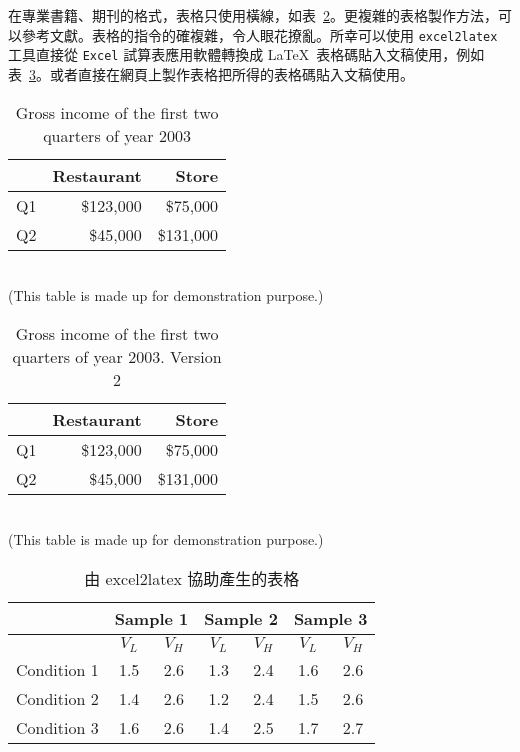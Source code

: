 在專業書籍、期刊的格式，表格只使用橫線，如表~\ref{tb:income_2003_v2}。更複雜的表格製作方法，可以參考文獻\cite{url_latex_wikibook_table}。表格的指令的確複雜，令人眼花撩亂。所幸可以使用 \texttt{excel2latex} 工具直接從 \texttt{Excel} 試算表應用軟體轉換成 \LaTeX\ 表格碼貼入文稿使用\cite{url_excel2latex}，例如表~\ref{tab:excel2latex}。或者直接在網頁上製作表格把所得的表格碼貼入文稿使用\cite{url_table_editor}。

\begin{table}[htbp]
\caption{\label{tb:income_2003}Gross income of the first two quarters of
year 2003}
\begin{center} \begin{tabular}{|c|r|r|}
\hline 
&
Restaurant&
Store\tabularnewline
\hline
\hline 
Q1&
\$123,000&
\$75,000\tabularnewline
\hline 
Q2&
\$45,000&
\$131,000\tabularnewline
\hline
\end{tabular}\\
(This table is made up for demonstration purpose.)
\end{center}
\end{table}%
%

\begin{table}[htbp]
\caption{\label{tb:income_2003_v2}Gross income of the first two quarters of
year 2003. Version 2}
\begin{center} \begin{tabular}{crr}
\hline 
&
Restaurant&
Store\tabularnewline
\hline
Q1&
\$123,000&
\$75,000\tabularnewline
 Q2&
\$45,000&
\$131,000\tabularnewline
\hline
\end{tabular}\\
(This table is made up for demonstration purpose.)
\end{center}
\end{table}

\begin{table}[htbp]
  \centering
  \caption{由 excel2latex 協助產生的表格}
  \vspace*{1ex}
    \begin{tabular}{|r|c|c|c|c|c|c|}
    \hline
          & \multicolumn{2}{c|}{Sample 1} & \multicolumn{2}{c|}{Sample 2} & \multicolumn{2}{c|}{Sample 3} \bigstrut\\
    \hline
          & $V_L$    & $V_H$    &  $V_L$    & $V_H$     &  $V_L$    & $V_H$  \bigstrut\\
    \hline
    Condition 1 & 1.5   & 2.6   & 1.3   & 2.4   & 1.6   & 2.6 \bigstrut\\
    \hline
    Condition 2 & 1.4   & 2.6   & 1.2   & 2.4   & 1.5   & 2.6 \bigstrut\\
    \hline
    Condition 3 & 1.6   & 2.6   & 1.4   & 2.5   & 1.7   & 2.7 \bigstrut\\
    \hline
    \end{tabular}%
  \label{tab:excel2latex}%
\end{table}
\clearpage
